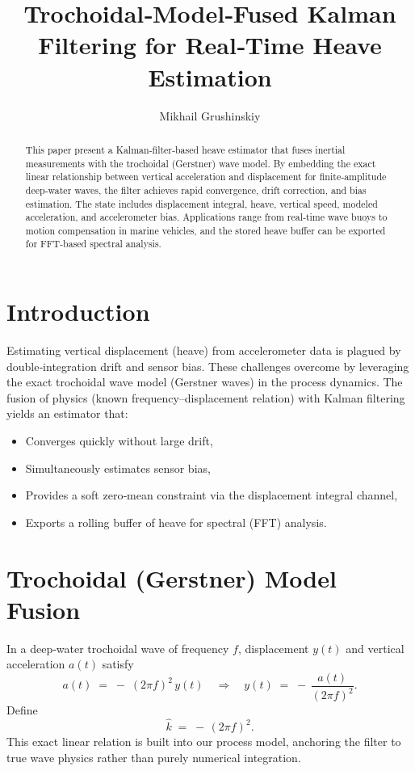 \documentclass[11pt,letterpaper]{article}
\title{Trochoidal‐Model‐Fused Kalman Filtering for Real‐Time Heave Estimation}
\author{Mikhail Grushinskiy}
\affil{Independent Researcher, 2025}
\begin{document}
\maketitle

\begin{abstract}
This paper present a Kalman‐filter‐based heave estimator that fuses inertial measurements with the trochoidal (Gerstner) wave model.  By embedding the exact linear relationship between vertical acceleration and displacement for finite‐amplitude deep‐water waves, the filter achieves rapid convergence, drift correction, and bias estimation.  The state includes displacement integral, heave, vertical speed, modeled acceleration, and accelerometer bias.  Applications range from real‐time wave buoys to motion compensation in marine vehicles, and the stored heave buffer can be exported for FFT‐based spectral analysis.
\end{abstract}

\section{Introduction}
Estimating vertical displacement (heave) from accelerometer data is plagued by double‐integration drift and sensor bias.  These challenges overcome by leveraging the exact trochoidal wave model (Gerstner waves) in the process dynamics.  The fusion of physics (known frequency–displacement relation) with Kalman filtering yields an estimator that:
\begin{itemize}
  \item Converges quickly without large drift,
  \item Simultaneously estimates sensor bias,
  \item Provides a soft zero‐mean constraint via the displacement integral channel,
  \item Exports a rolling buffer of heave for spectral (FFT) analysis.
\end{itemize}

\section{Trochoidal (Gerstner) Model Fusion}
In a deep‐water trochoidal wave of frequency \(f\), displacement \(y(t)\) and vertical acceleration \(a(t)\) satisfy
\[
a(t) \;=\; -\;(2\pi f)^2\,y(t)\quad\Longrightarrow\quad
y(t) \;=\; -\,\frac{a(t)}{(2\pi f)^2}.
\]
Define
\[
\hat{k} \;=\; -\,(2\pi f)^2.
\]
This exact linear relation is built into our process model, anchoring the filter to true wave physics rather than purely numerical integration.
\end{document}
